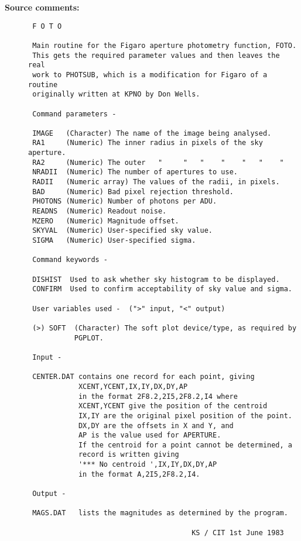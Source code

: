 \begin{description}
\item [{\bf Source comments:}]
\begin{verbatim}
 F O T O

 Main routine for the Figaro aperture photometry function, FOTO.
 This gets the required parameter values and then leaves the real
 work to PHOTSUB, which is a modification for Figaro of a routine
 originally written at KPNO by Don Wells.

 Command parameters -

 IMAGE   (Character) The name of the image being analysed.
 RA1     (Numeric) The inner radius in pixels of the sky aperture.
 RA2     (Numeric) The outer   "     "   "    "    "   "    "
 NRADII  (Numeric) The number of apertures to use.
 RADII   (Numeric array) The values of the radii, in pixels.
 BAD     (Numeric) Bad pixel rejection threshold.
 PHOTONS (Numeric) Number of photons per ADU.
 READNS  (Numeric) Readout noise.
 MZERO   (Numeric) Magnitude offset.
 SKYVAL  (Numeric) User-specified sky value.
 SIGMA   (Numeric) User-specified sigma.

 Command keywords -

 DISHIST  Used to ask whether sky histogram to be displayed.
 CONFIRM  Used to confirm acceptability of sky value and sigma.

 User variables used -  (">" input, "<" output)

 (>) SOFT  (Character) The soft plot device/type, as required by
           PGPLOT.

 Input -

 CENTER.DAT contains one record for each point, giving
            XCENT,YCENT,IX,IY,DX,DY,AP
            in the format 2F8.2,2I5,2F8.2,I4 where
            XCENT,YCENT give the position of the centroid
            IX,IY are the original pixel position of the point.
            DX,DY are the offsets in X and Y, and
            AP is the value used for APERTURE.
            If the centroid for a point cannot be determined, a
            record is written giving
            '*** No centroid ',IX,IY,DX,DY,AP
            in the format A,2I5,2F8.2,I4.

 Output -

 MAGS.DAT   lists the magnitudes as determined by the program.

                                       KS / CIT 1st June 1983
\end{verbatim}
\end{description}
